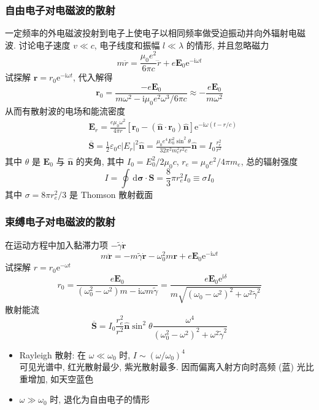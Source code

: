 \documentclass[12pt,a4paper]{article}%
\numberwithin{equation}{section}%
\renewcommand*{\vec}[1]{\bm{#1}}%
\newcommand{\dif}{\,\mathrm d}
\newcommand\mi{\mathrm{i}}
\newcommand\e{\mathrm{e}}%
\newcommand*{\uvec}[1]{\hat{\vec{#1}}}
\begin{document}
\subsubsection{自由电子对电磁波的散射} %
\label{ssub:free_electro_scattering}
一定频率的外电磁波投射到电子上使电子以相同频率做受迫振动并向外辐射电磁波. 讨论电子速度 $v\ll c$, 电子线度和振幅 $l\ll\lambda$ 的情形, 并且忽略磁力
\begin{equation}
    m\ddot r = \frac{\mu_0 e^2}{6\pi c}\dddot r + e\vec E_0\e^{-\mi\omega t}
\end{equation}
试探解 $\vec r = r_0\e^{-\mi\omega t}$, 代入解得
\begin{equation}
    \vec r_0 = \frac{-e\vec E_0}{m\omega^2 - \mi\mu_0 e^2\omega^3/6\pi c}\approx -\frac{e\vec E_0}{m\omega^2}
\end{equation}
从而有散射波的电场和能流密度
\begin{align}
    &\vec E_r = \frac{e\mu_0\omega^2}{4\pi r}\left[\vec r_0 - (\uvec n\cdot\vec r_0)\uvec n\right]\e^{-\mi\omega(t-r/c)} \\
    &\overline{\vec S} = \frac12 \varepsilon_0c|E_r|^2\uvec n = \frac{\mu_0 e^4 E_0^2\sin^2\theta}{32\pi^2m_e^2 r^2 c}\uvec n = I_0\frac{r_e^2}{r^2}
\end{align}
其中 $\theta$ 是 $\vec E_0$ 与 $\uvec n$ 的夹角, 其中 $I_0 = E_0^2/2\mu_0 c$, $r_e = \mu_0 e^2/4\pi m_e$, 总的辐射强度
\begin{equation}
    I = \oint\dif\vec\sigma\cdot\vec S = \frac 83 \pi r_e^2 I_0\equiv\sigma I_0
\end{equation}
其中 $\sigma = 8\pi r_e^2/3$ 是 Thomson 散射截面
\subsubsection{束缚电子对电磁波的散射} %
\label{ssub:bounded_electro_scattering}
在运动方程中加入黏滞力项 $-\tilde{\gamma}\dot{\vec r}$
\begin{equation}
    m\ddot{\vec r} = -m\tilde{\gamma}\dot{\vec r} - \omega_0^2 m\vec r + e\vec E_0\e^{-\mi\omega t}
\end{equation}
试探解 $r = r_0\e^{-\omega t}$
\begin{equation}\label{equ:bounded_scattering}
    r_0 = \frac{e\vec E_0}{(\omega_0^2 - \omega^2)m - \mi\omega m\tilde{\gamma}}
    =\frac{e\vec E_0\e^{\mi\delta}}{m\sqrt{(\omega_0 - \omega^2)^2 + \omega^2\tilde{\gamma}^2} }
\end{equation}
散射能流
\begin{equation}
    \overline{\vec S} = I_0\frac{r_e^2}{r^2}\uvec n\sin^2\theta\frac{\omega^4}{(\omega_0^2 - \omega^2)^2 + \omega^2\tilde{\gamma}^2}
\end{equation}
\begin{itemize}
    \item Rayleigh 散射: 在 $\omega\ll\omega_0$ 时, $I\sim (\omega/\omega_0)^4$ \\
    可见光谱中, 红光散射最少, 紫光散射最多. 因而偏离入射方向时高频 (蓝) 光比重增加, 如天空蓝色
    \item $\omega\gg\omega_0$ 时, 退化为自由电子的情形
\end{itemize}
\end{document}
